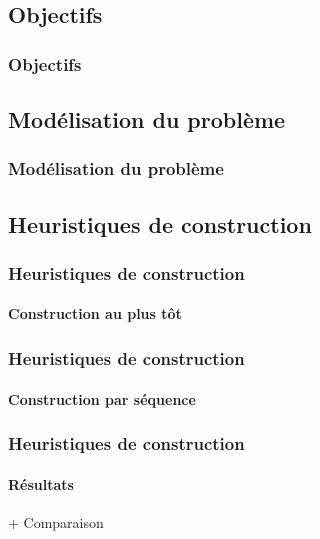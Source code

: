 \subsection{Objectifs}
\begin{frame}
	\frametitle{Objectifs}
\end{frame}

\subsection{Modélisation du problème}
\begin{frame}
	\frametitle{Modélisation du problème}
	\begin{center}
		
	\end{center}
\end{frame}

\subsection{Heuristiques de construction}
\begin{frame}
	\frametitle{Heuristiques de construction}
	\framesubtitle{Construction au plus tôt}
\end{frame}
\begin{frame}
	\frametitle{Heuristiques de construction}
	\framesubtitle{Construction par séquence}
\end{frame}
\begin{frame}
	\frametitle{Heuristiques de construction}
	\framesubtitle{Résultats}
	+ Comparaison
\end{frame}

